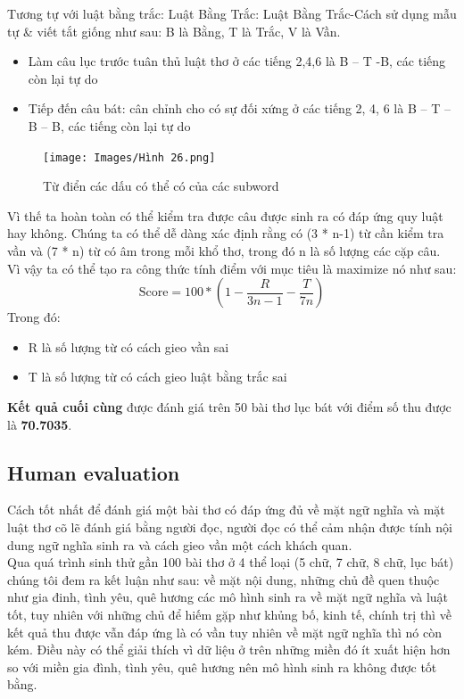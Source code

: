 \documentclass[a4paper]{article}
\theoremstyle{definition}
\begin{document}
Tương tự với luật bằng trắc:  Luật Bằng Trắc: Luật Bằng Trắc-Cách sử dụng mẫu tự & viết tắt giống như sau: B là Bằng, T là Trắc, V là Vần.
\begin{itemize}
    \item Làm câu lục trước tuân thủ luật thơ ở các tiếng 2,4,6 là B – T -B, các tiếng còn lại tự do
    \item Tiếp đến câu bát: cân chỉnh cho có sự đối xứng ở các tiếng 2, 4, 6 là B – T – B – B, các tiếng còn lại tự do
\end{itemize}
\begin{figure}[h!]
\begin{center}
\texttt{[image: Images/Hình 26.png]} \\[0.15in]

\caption{Từ điển các dấu có thể có của các subword}
\end{center}
\end{figure}
Vì thế ta hoàn toàn có thể kiểm tra được câu được sinh ra có đáp ứng quy luật hay không.
Chúng ta có thể dễ dàng xác định rằng có (3 * n-1) từ cần kiểm tra vần và (7 * n) từ có âm trong mỗi khổ thơ, trong đó n là số lượng các cặp câu. Vì vậy ta có thể tạo ra công thức tính điểm với mục tiêu là maximize nó như sau: 
$$\text{Score} = 100*(1-\frac{R}{3n-1} - \frac{T}{7n})$$
Trong đó:
\begin{itemize}
    \item R là số lượng từ có cách gieo vần sai

    \item T là số lượng từ có cách gieo luật bằng trắc sai
\end{itemize}

\textbf{Kết quả cuối cùng} được đánh giá trên 50 bài thơ lục bát với điểm số thu được là \textbf{70.7035}. 
\subsection{Human evaluation}
Cách tốt nhất để đánh giá một bài thơ có đáp ứng đủ về mặt ngữ nghĩa và mặt luật thơ cõ lẽ đánh giá bằng người đọc, người đọc có thể cảm nhận được tính nội dung ngữ nghĩa sinh ra và cách gieo vần một cách khách quan.\\
Qua quá trình sinh thử gần 100 bài thơ ở 4 thể loại (5 chữ, 7 chữ, 8 chữ, lục bát) chúng tôi đem ra kết luận như sau: về mặt nội dung, những chủ đề quen thuộc như gia đinh, tình yêu, quê hương các mô hình sinh ra về mặt ngữ nghĩa và luật tốt, tuy nhiên với những chủ để hiếm gặp như khủng bố, kinh tế, chính trị thì về kết quả thu được vẫn đáp ứng là có vần tuy nhiên về mặt ngữ nghĩa thì nó còn kém. Điều này có thể giải thích vì dữ liệu ở trên những miền đó ít xuất hiện hơn so với miền gia đình, tình yêu, quê hương nên mô hình sinh ra không được tốt bằng.
\newpage
\end{document}
